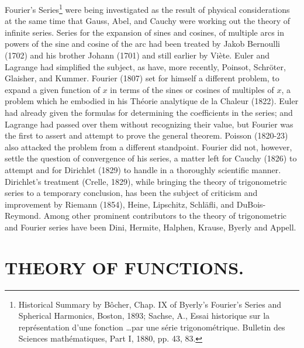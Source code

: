 \documentclass[oneside]{book}
\begin{document}
Fourier's Series\footnote{Historical Summary by B\^ocher, Chap. IX
of Byerly's Fourier's Series and Spherical Harmonics, Boston, 1893;
Sachse, A., Essai historique sur la repr\'esentation d'une fonction
\ldots par une s\'erie trigonom\'etrique. Bulletin des Sciences
math\'ematiques, Part I, 1880, pp. 43, 83.} were being investigated
as the result of physical considerations at the same time that
Gauss, Abel, and Cauchy were working out the theory of infinite
series. Series for the expansion of sines and cosines, of multiple
arcs in powers of the sine and cosine of the arc had been treated by
Jakob Bernoulli (1702) and his brother Johann (1701) and still
earlier by Vi\`ete. Euler and Lagrange had simplified the subject,
as have, more recently, Poinsot, Schr\"oter, Glaisher, and
Kummer. Fourier (1807) set for himself a different problem, to
expand a given function of $x$ in terms of the sines or cosines of
multiples of $x$, a problem which he embodied in his Th\'eorie
analytique de la Chaleur (1822). Euler had already given the
formulas for determining the coefficients in the series; and
Lagrange had passed over them without recognizing their value, but
Fourier was the first to assert and attempt to prove the general
theorem. Poisson (1820-23) also attacked the problem from a
different standpoint. Fourier did not, however, settle the question
of convergence of his series, a matter left for Cauchy (1826) to
attempt and for Dirichlet (1829) to handle in a thoroughly
scientific manner. Dirichlet's treatment (Crelle, 1829), while
bringing the theory of trigonometric series to a temporary
conclusion, has been the subject of criticism and improvement by
Riemann (1854), Heine, Lipschitz, Schl\"afli, and
DuBois-Reymond. Among other prominent contributors to the theory of
trigonometric and Fourier series have been Dini, Hermite, Halphen,
Krause, Byerly and Appell.

\chapter{THEORY OF FUNCTIONS.}
\end{document}
